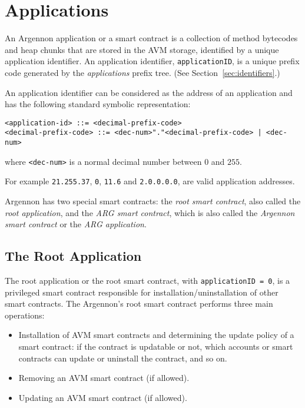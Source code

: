 
\section{Applications}\label{sec:applications}

An Argennon application or a smart contract is a collection of method bytecodes and heap chunks that are stored in
the AVM storage, identified by a unique application identifier. An application identifier, \texttt{applicationID}, is
a unique prefix code generated by the \emph{applications} prefix tree. (See Section~\ref{sec:identifiers}.)

An application identifier can
be considered as the address of an application and has the following standard symbolic representation:
\begin{verbatim}
<application-id> ::= <decimal-prefix-code>
<decimal-prefix-code> ::= <dec-num>"."<decimal-prefix-code> | <dec-num>
\end{verbatim}
where \texttt{<dec-num>} is a normal decimal number between $0$ and $255$.

For example \texttt{21.255.37}, \texttt{0}, \texttt{11.6} and \texttt{2.0.0.0.0}, are valid application addresses.

Argennon has two special smart contracts: the \emph{root smart contract}, also called the \emph{root application}, and
the \emph{ARG smart contract}, which is also called the \emph{Argennon smart contract} or the \emph{ARG application}.

\subsection{The Root Application}\label{subsec:the-root-app}

The root application or the root smart contract, with \texttt{applicationID = 0}, is a privileged smart contract
responsible for installation/uninstallation of other smart contracts. The Argennon's root smart contract
performs three main operations:

\begin{itemize}
    \item Installation of AVM smart contracts and determining the update policy of a smart
    contract: if the contract is updatable or not, which accounts or smart contracts can update or uninstall
    the contract, and so on.
    \item Removing an AVM smart contract (if allowed).
    \item Updating an AVM smart contract (if allowed).
\end{itemize}

